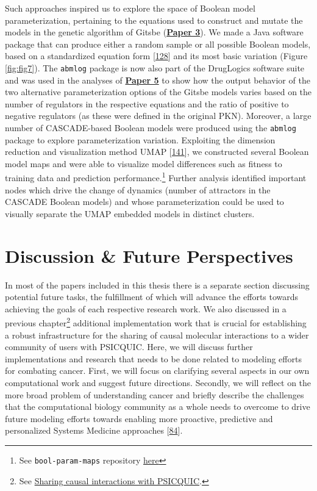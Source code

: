 \documentclass[
  12pt,
]{book}
\begin{document}
Such approaches inspired us to explore the space of Boolean model parameterization, pertaining to the equations used to construct and mutate the models in the genetic algorithm of Gitsbe (\textbf{\protect\hyperlink{Paper3}{Paper 3}}).
We made a Java software package that can produce either a random sample or all possible Boolean models, based on a standardized equation form {[}\protect\hyperlink{ref-Mendoza2006}{128}{]} and its most basic variation (Figure \ref{fig:fig7}).
The \texttt{abmlog} package is now also part of the DrugLogics software suite and was used in the analyses of \textbf{\protect\hyperlink{Paper5}{Paper 5}} to show how the output behavior of the two alternative parameterization options of the Gitsbe models varies based on the number of regulators in the respective equations and the ratio of positive to negative regulators (as these were defined in the original PKN).
Moreover, a large number of CASCADE-based Boolean models were produced using the \texttt{abmlog} package to explore parameterization variation.
Exploiting the dimension reduction and visualization method UMAP {[}\protect\hyperlink{ref-McInnes2018}{141}{]}, we constructed several Boolean model maps and were able to visualize model differences such as fitness to training data and prediction performance.\footnote{See \texttt{bool-param-maps} repository \protect\hyperlink{misc-links}{here}}
Further analysis identified important nodes which drive the change of dynamics (number of attractors in the CASCADE Boolean models) and whose parameterization could be used to visually separate the UMAP embedded models in distinct clusters.

\newpage

\hypertarget{discussion-future-perspectives}{%
\section*{Discussion \& Future Perspectives}\label{discussion-future-perspectives}}

\indent

In most of the papers included in this thesis there is a separate section discussing potential future tasks, the fulfillment of which will advance the efforts towards achieving the goals of each respective research work.
We also discussed in a previous chapter\footnote{See \protect\hyperlink{psicquic-chapter}{Sharing causal interactions with PSICQUIC}.} additional implementation work that is crucial for establishing a robust infrastructure for the sharing of causal molecular interactions to a wider community of users with PSICQUIC.
Here, we will discuss further implementations and research that needs to be done related to modeling efforts for combating cancer.
First, we will focus on clarifying several aspects in our own computational work and suggest future directions.
Secondly, we will reflect on the more broad problem of understanding cancer and briefly describe the challenges that the computational biology community as a whole needs to overcome to drive future modeling efforts towards enabling more proactive, predictive and personalized Systems Medicine approaches {[}\protect\hyperlink{ref-Hood2011}{84}{]}.
\end{document}
